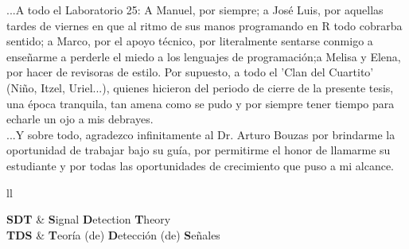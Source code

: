 \documentclass[
11pt, %
spanish, %
singlespacing, %
headsepline, %
]{MastersDoctoralThesis} %
\begin{document}
\begin{acknowledgements}
...A todo el Laboratorio 25: A Manuel, por siempre; a José Luis, por aquellas tardes de viernes en que al ritmo de sus manos programando en R todo cobrarba sentido; a Marco, por el apoyo técnico, por literalmente sentarse conmigo a enseñarme a perderle el miedo a los lenguajes de programación;a Melisa y Elena, por  hacer de revisoras de estilo. Por supuesto, a todo el 'Clan del Cuartito' (Niño, Itzel, Uriel...), quienes hicieron del periodo de cierre de la presente tesis, una época tranquila, tan amena como se pudo y por siempre tener tiempo para echarle un ojo a mis debrayes.\\

...Y sobre todo, agradezco infinitamente al Dr. Arturo Bouzas por brindarme la oportunidad de trabajar bajo su guía, por permitirme el honor de llamarme su estudiante y por todas las oportunidades de crecimiento que puso a mi alcance.

\end{acknowledgements}


\tableofcontents %

\listoffigures %

\listoftables %


\begin{abbreviations}{ll} %

\textbf{SDT} & \textbf{S}ignal \textbf{D}etection \textbf{T}heory\\
\textbf{TDS} & \textbf{T}eoría (de) \textbf{D}etección (de) \textbf{S}eñales\\

\end{abbreviations}

\end{document}
